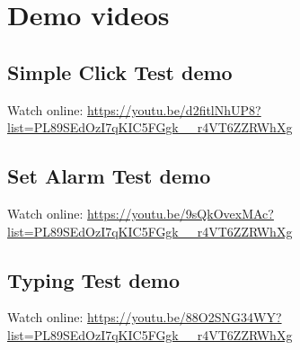 \chapter{Demo videos}
\label{ch:droid_setup}
\section{Simple Click Test demo}
Watch online: \url{https://youtu.be/d2fitlNhUP8?list=PL89SEdOzI7qKIC5FGgk__r4VT6ZZRWhXg}

\section{Set Alarm Test demo}
Watch online: \url{https://youtu.be/9sQkOvexMAc?list=PL89SEdOzI7qKIC5FGgk__r4VT6ZZRWhXg}

\section{Typing Test demo}
Watch online: \url{https://youtu.be/88O2SNG34WY?list=PL89SEdOzI7qKIC5FGgk__r4VT6ZZRWhXg}

